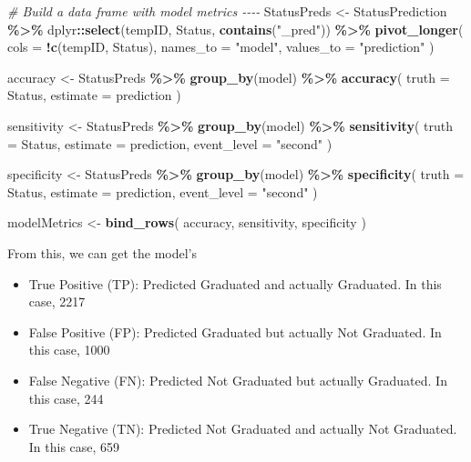 \documentclass[
]{article}
\newenvironment{Shaded}{\begin{snugshade}}{\end{snugshade}}
\newcommand{\AttributeTok}[1]{\textcolor[rgb]{0.13,0.29,0.53}{#1}}
\newcommand{\CommentTok}[1]{\textcolor[rgb]{0.56,0.35,0.01}{\textit{#1}}}
\newcommand{\FunctionTok}[1]{\textcolor[rgb]{0.13,0.29,0.53}{\textbf{#1}}}
\newcommand{\NormalTok}[1]{#1}
\newcommand{\OtherTok}[1]{\textcolor[rgb]{0.56,0.35,0.01}{#1}}
\newcommand{\SpecialCharTok}[1]{\textcolor[rgb]{0.81,0.36,0.00}{\textbf{#1}}}
\newcommand{\StringTok}[1]{\textcolor[rgb]{0.31,0.60,0.02}{#1}}
\begin{document}
\begin{Shaded}
\begin{Highlighting}[]
\CommentTok{\# Build a data frame with model metrics {-}{-}{-}{-}}
\NormalTok{StatusPreds }\OtherTok{\textless{}{-}}\NormalTok{ StatusPrediction }\SpecialCharTok{\%\textgreater{}\%}
\NormalTok{  dplyr}\SpecialCharTok{::}\FunctionTok{select}\NormalTok{(tempID, Status, }\FunctionTok{contains}\NormalTok{(}\StringTok{"\_pred"}\NormalTok{)) }\SpecialCharTok{\%\textgreater{}\%}
  \FunctionTok{pivot\_longer}\NormalTok{(}
    \AttributeTok{cols =} \SpecialCharTok{!}\FunctionTok{c}\NormalTok{(tempID, Status),}
    \AttributeTok{names\_to =} \StringTok{"model"}\NormalTok{,}
    \AttributeTok{values\_to =} \StringTok{"prediction"}
\NormalTok{  )}

\NormalTok{accuracy }\OtherTok{\textless{}{-}}\NormalTok{ StatusPreds }\SpecialCharTok{\%\textgreater{}\%}
  \FunctionTok{group\_by}\NormalTok{(model) }\SpecialCharTok{\%\textgreater{}\%}
  \FunctionTok{accuracy}\NormalTok{(}
    \AttributeTok{truth =}\NormalTok{ Status,}
    \AttributeTok{estimate =}\NormalTok{ prediction}
\NormalTok{  )}

\NormalTok{sensitivity }\OtherTok{\textless{}{-}}\NormalTok{ StatusPreds }\SpecialCharTok{\%\textgreater{}\%}
  \FunctionTok{group\_by}\NormalTok{(model) }\SpecialCharTok{\%\textgreater{}\%}
  \FunctionTok{sensitivity}\NormalTok{(}
    \AttributeTok{truth =}\NormalTok{ Status,}
    \AttributeTok{estimate =}\NormalTok{ prediction,}
    \AttributeTok{event\_level =} \StringTok{"second"}
\NormalTok{  )}

\NormalTok{specificity }\OtherTok{\textless{}{-}}\NormalTok{ StatusPreds }\SpecialCharTok{\%\textgreater{}\%}
  \FunctionTok{group\_by}\NormalTok{(model) }\SpecialCharTok{\%\textgreater{}\%}
  \FunctionTok{specificity}\NormalTok{(}
    \AttributeTok{truth =}\NormalTok{ Status,}
    \AttributeTok{estimate =}\NormalTok{ prediction,}
    \AttributeTok{event\_level =} \StringTok{"second"}
\NormalTok{  )}

\NormalTok{modelMetrics }\OtherTok{\textless{}{-}} \FunctionTok{bind\_rows}\NormalTok{(}
\NormalTok{  accuracy,}
\NormalTok{  sensitivity,}
\NormalTok{  specificity}
\NormalTok{)}
\end{Highlighting}
\end{Shaded}

From this, we can get the model's

\begin{itemize}
\item
  True Positive (TP): Predicted Graduated and actually Graduated. In
  this case, 2217
\item
  False Positive (FP): Predicted Graduated but actually Not Graduated.
  In this case, 1000
\item
  False Negative (FN): Predicted Not Graduated but actually Graduated.
  In this case, 244
\item
  True Negative (TN): Predicted Not Graduated and actually Not
  Graduated. In this case, 659
\end{itemize}
\end{document}
